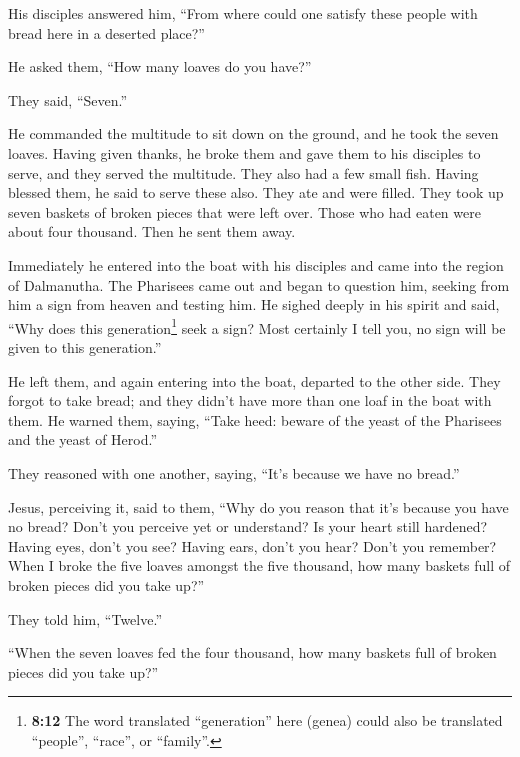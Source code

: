  His disciples answered him, ``From where could one
satisfy these people with bread here in a deserted place?''

 He asked them, ``How many loaves do you have?''

They said, ``Seven.''

 He commanded the multitude to sit down on the ground, and
he took the seven loaves. Having given thanks, he broke them and gave
them to his disciples to serve, and they served the multitude.
 They also had a few small fish. Having blessed them, he
said to serve these also.  They ate and were filled. They
took up seven baskets of broken pieces that were left over.
 Those who had eaten were about four thousand. Then he
sent them away.

 Immediately he entered into the boat with his disciples
and came into the region of Dalmanutha.  The Pharisees
came out and began to question him, seeking from him a sign from heaven
and testing him.  He sighed deeply in his spirit and
said, ``Why does this generation\footnote{\textbf{8:12} The word
  translated ``generation'' here (genea) could also be translated
  ``people'', ``race'', or ``family''.} seek a sign? Most certainly I
tell you, no sign will be given to this generation.''

 He left them, and again entering into the boat, departed
to the other side.  They forgot to take bread; and they
didn't have more than one loaf in the boat with them.  He
warned them, saying, ``Take heed: beware of the yeast of the Pharisees
and the yeast of Herod.''

 They reasoned with one another, saying, ``It's because
we have no bread.''

 Jesus, perceiving it, said to them, ``Why do you reason
that it's because you have no bread? Don't you perceive yet or
understand? Is your heart still hardened?  Having eyes,
don't you see? Having ears, don't you hear? Don't you remember?
 When I broke the five loaves amongst the five thousand,
how many baskets full of broken pieces did you take up?''

They told him, ``Twelve.''

 ``When the seven loaves fed the four thousand, how many
baskets full of broken pieces did you take up?''

